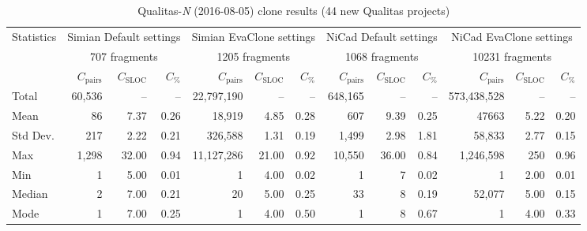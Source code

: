 \documentclass{sig-alternate-05-2015}
\begin{document}
\begin{table}
	\centering
	\caption{Qualitas-\textit{N} (2016-08-05) clone results (44 new Qualitas projects)}
	\label{t_simian_raw_results}
	\small
		\begin{tabular}{l|r|r|r|r|r|r|r|r|r|r|r|r}
			\hline
			\multirow{3}{*}{Statistics} 
			& \multicolumn{3}{c|}{Simian Default settings} 
			& \multicolumn{3}{c|}{Simian EvaClone settings} 
			& \multicolumn{3}{c|}{NiCad Default settings} 
			& \multicolumn{3}{c}{NiCad EvaClone settings} \\ \cline{2-13} 
			& \multicolumn{3}{c|}{707 fragments} 
			& \multicolumn{3}{c|}{1205 fragments} 
			& \multicolumn{3}{c|}{1068 fragments} 
			& \multicolumn{3}{c}{10231 fragments} \\  \cline{2-13}
			& $C_{\mathrm{pairs}}$ & $C_{\mathrm{SLOC}}$ & $C_{\mathrm{\%}}$ 
			& $C_{\mathrm{pairs}}$ & $C_{\mathrm{SLOC}}$ & $C_{\mathrm{\%}}$
			& $C_{\mathrm{pairs}}$ & $C_{\mathrm{SLOC}}$ & $C_{\mathrm{\%}}$ 
			& $C_{\mathrm{pairs}}$ & $C_{\mathrm{SLOC}}$ & $C_{\mathrm{\%}}$ \\
			\hline
			Total & 60,536 & -- 	& -- 	& 22,797,190 & -- 	& --  & 648,165 & -- & -- & 573,438,528 & -- & -- \\ 
			Mean 	& 86 	& 7.37 	& 0.26 	& 18,919 	& 4.85 	& 0.28 & 607 & 9.39 & 0.25 & 47663 & 5.22 & 0.20 \\
			Std Dev. & 217 	& 2.22 	& 0.21 	& 326,588 	& 1.31 	& 0.19 & 1,499 & 2.98 & 1.81 & 58,833 & 2.77 & 0.15 \\
			Max 	& 1,298 & 32.00 & 0.94 & 11,127,286 & 21.00 & 0.92 & 10,550 & 36.00 & 0.84 & 1,246,598 & 250 & 0.96 \\
			Min 	& 1 	& 5.00 	& 0.01 	& 1 & 4.00 	& 0.02 & 1 & 7 & 0.02 & 1 & 2.00 & 0.01\\
			Median 	& 2 & 7.00 	& 0.21 	& 20		& 5.00 	& 0.25 & 33 & 8 & 0.19 & 52,077 & 5.00 & 0.15 \\
			Mode & 1 	& 7.00 	& 0.25 	& 1 		& 4.00 	& 0.50 & 1 & 8 & 0.67 & 1 & 4.00 & 0.33 \\
			\hline
		\end{tabular} %
\end{table}
\end{document}
